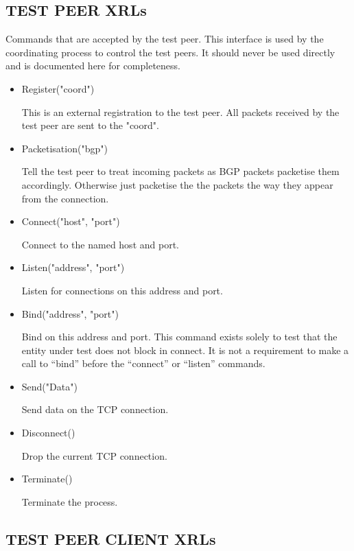\documentclass[11pt]{article}
\begin{document}
\subsection{TEST PEER XRLs}
Commands that are accepted by the test peer. This interface is
used by the coordinating process to control the test peers. It should
never be used directly and is documented here for completeness.

\begin{itemize}
\item Register("coord")
  
  This is an external registration to the test peer. All packets
  received by the test peer are sent to the "coord".

\item Packetisation("bgp")
  
  Tell the test peer to treat incoming packets as BGP packets
  packetise them accordingly. Otherwise just packetise the the packets
  the way they appear from the connection.
        
\item Connect("host", "port")

  Connect to the named host and port.

\item Listen("address", "port")

  Listen for connections on this address and port.

\item Bind("address", "port")

  Bind on this address and port. This command exists solely to test
  that the entity under test does not block in connect. It is not a
  requirement to make a call to ``bind'' before the ``connect'' or
  ``listen'' commands. 

\item Send("Data")
  
  Send data on the TCP connection.        

\item Disconnect()

  Drop the current TCP connection.

\item Terminate()

  Terminate the process.

\end{itemize}

\subsection{TEST PEER CLIENT XRLs}
\end{document}
